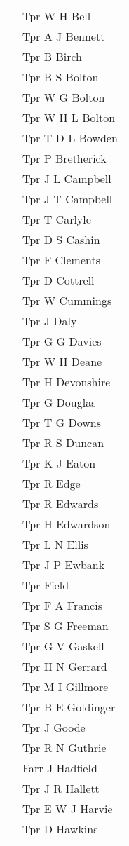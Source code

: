 \begin{center}
\begin{tabular}{rl}
    & Tpr W H Bell \\
    & Tpr A J Bennett \\
    & Tpr B Birch \\
    & Tpr B S Bolton \\
    & Tpr W G Bolton \\
    & Tpr W H L Bolton \\
    & Tpr T D L Bowden \\
    & Tpr P Bretherick \\
    & Tpr J L Campbell \\
    & Tpr J T Campbell \\
    & Tpr T Carlyle \\
    & Tpr D S Cashin \\
    & Tpr F Clements \\
    & Tpr D Cottrell \\
    & Tpr W Cummings \\
    & Tpr J Daly \\
    & Tpr G G Davies \\
    & Tpr W H Deane \\
    & Tpr H Devonshire \\
    & Tpr G Douglas \\
    & Tpr T G Downs \\
    & Tpr R S Duncan \\
    & Tpr K J Eaton \\
    & Tpr R Edge \\
    & Tpr R Edwards \\
    & Tpr H Edwardson \\
    & Tpr L N Ellis \\
    & Tpr J P Ewbank \\
    & Tpr Field \\
    & Tpr F A Francis \\
    & Tpr S G Freeman \\
    & Tpr G V Gaskell \\
    & Tpr H N Gerrard \\
    & Tpr M I Gillmore \\
    & Tpr B E Goldinger \\
    & Tpr J Goode \\
    & Tpr R N Guthrie \\
    & Farr J Hadfield \\
    & Tpr J R Hallett \\
    & Tpr E W J Harvie \\
    & Tpr D Hawkins \\

\end{tabular}
\end{center}
